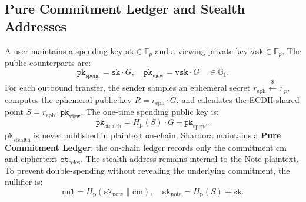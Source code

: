 \documentclass[sigconf,nonacm]{acmart}
\begin{document}
\subsection{Pure Commitment Ledger and Stealth Addresses}
A user maintains a spending key $\mathtt{sk} \in \mathbb{F}_p$ and a viewing private key $\mathtt{vsk} \in \mathbb{F}_p$. The public counterparts are:
\begin{equation}
\mathtt{pk}_{\text{spend}} = \mathtt{sk} \cdot G, \quad \mathtt{pk}_{\text{view}} = \mathtt{vsk} \cdot G \quad \in \mathbb{G}_1.
\end{equation}
For each outbound transfer, the sender samples an ephemeral secret $r_{\text{eph}} \xleftarrow{\$} \mathbb{F}_p$, computes the ephemeral public key $R = r_{\text{eph}} \cdot G$, and calculates the ECDH shared point $S = r_{\text{eph}} \cdot \mathtt{pk}_{\text{view}}$. The one-time spending public key is:
\begin{equation}
\mathtt{pk}_{\text{stealth}} = H_{\text{p}}(S) \cdot G + \mathtt{pk}_{\text{spend}}.
\end{equation}
$\mathtt{pk}_{\text{stealth}}$ is never published in plaintext on-chain. Shardora maintains a \textbf{Pure Commitment Ledger}: the on-chain ledger records only the commitment $\text{cm}$ and ciphertext $\mathtt{ct}_{\text{ecies}}$. The stealth address remains internal to the Note plaintext. To prevent double-spending without revealing the underlying commitment, the nullifier is:
\begin{equation}
\mathtt{nul} = H_{\text{p}}(\mathtt{sk}_{\text{note}} \parallel \text{cm}), \quad \mathtt{sk}_{\text{note}} = H_{\text{p}}(S) + \mathtt{sk}.
\end{equation}
\end{document}
